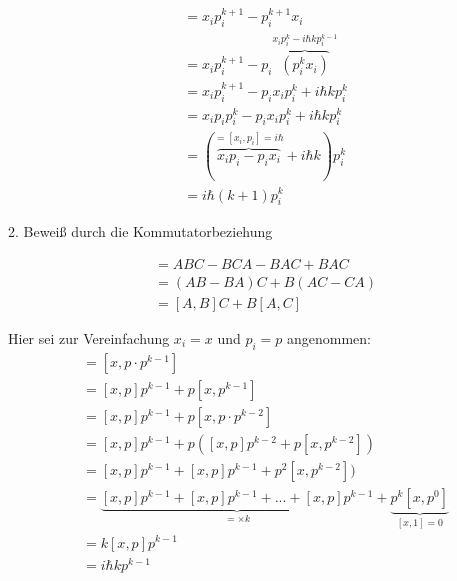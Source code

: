 \documentclass[12pt,a4paper,titlepage,oneside]{report}
\begin{document}
\begin{align} [x_i,p_i^{k+1}] &= x_ip_i^{k+1}-p_i^{k+1}x_i \\
&= x_ip_i^{k+1}-p_i\overbrace{(p_i^kx_i)}^{x_ip_i^k-i\hbar k p_i^{k-1}}\\
&=x_ip_i^{k+1}-p_ix_ip_i^k+i\hbar k p_i^{k}\\
&=x_ip_ip_i^{k}-p_ix_ip_i^k+i\hbar k p_i^{k}\\
&=(\overbrace{x_ip_i-p_ix_i}^{=[x_i,p_i]=i\hbar}+i\hbar k )p_i^{k}\\
&=i\hbar (k+1) p_i^{k} 
\end{align}


2. Beweiß durch die Kommutatorbeziehung 

\begin{align} [A,BC]&=ABC-BCA-BAC+BAC\\
&=(AB-BA)C+B(AC-CA)\\
&=[A,B]C+B[A,C]
\end{align}


Hier sei zur Vereinfachung $x_i=x$ und $p_i=p$ angenommen:
\begin{align} [x,p^k]&=[x,p\cdot p^{k-1}]\\
&=[x,p]p^{k-1}+p[x,p^{k-1}]\\
&=[x,p]p^{k-1}+p[x,p\cdot p^{k-2}]\\
&=[x,p]p^{k-1}+p([x,p]p^{k-2}+p[x,p^{k-2}]) \\
&=[x,p]p^{k-1}+[x,p]p^{k-1}+p^2[x,p^{k-2}]) \\
&=\underbrace{[x,p]p^{k-1}+[x,p]p^{k-1}+...+[x,p]p^{k-1}}_{=\times
  k}+\underbrace{p^k[x,p^{0}]}_{[x,1]=0}\\
&=k[x,p]p^{k-1} \\
&=i\hbar kp^{k-1}
\end{align}
\end{document}
